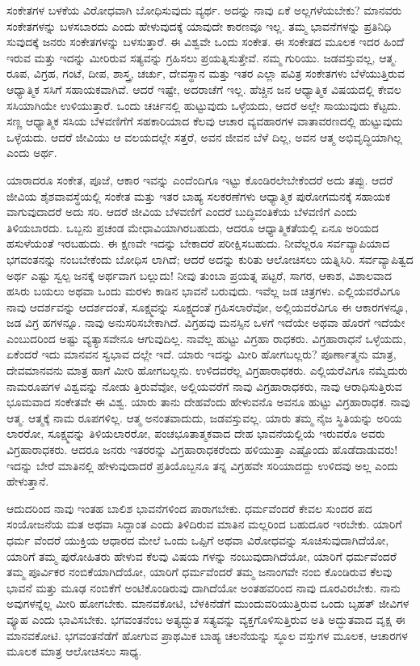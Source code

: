ಸಂಕೇತಗಳ ಬಳಕೆಯ ವಿರೋಧವಾಗಿ ಬೋಧಿಸುವುದು ವ್ಯರ್ಥ. ಅದನ್ನು ನಾವು ಏಕೆ ಅಲ್ಲಗಳೆಯಬೇಕು? ಮಾನವರು ಸಂಕೇತಗಳನ್ನು ಬಳಸಬಾರದು ಎಂದು ಹೇಳುವುದಕ್ಕೆ ಯಾವುದೇ ಕಾರಣವೂ ಇಲ್ಲ. ತಮ್ಮ ಭಾವನೆಗಳನ್ನು ಪ್ರತಿನಿಧಿ ಸುವುದಕ್ಕೆ ಜನರು ಸಂಕೇತಗಳನ್ನು ಬಳಸುತ್ತಾರೆ. ಈ ವಿಶ್ವವೇ ಒಂದು ಸಂಕೇತ. ಈ ಸಂಕೇತದ ಮೂಲಕ ಇದರ ಹಿಂದೆ ಇರುವ ಮತ್ತು ಇದನ್ನು ಮೀರಿರುವ ಸತ್ಯವನ್ನು ಗ್ರಹಿಸಲು ಪ್ರಯತ್ನಿಸುತ್ತೇವೆ. ನಮ್ಮ ಗುರಿಯು. ಜಡವಸ್ತುವಲ್ಲ, ಆತ್ಮ. ರೂಪ, ವಿಗ್ರಹ, ಗಂಟೆ, ದೀಪ, ಶಾಸ್ತ್ರ, ಚರ್ಚು, ದೇವಸ್ಥಾನ ಮತ್ತು ಇತರ ಎಲ್ಲಾ ಪವಿತ್ರ ಸಂಕೇತಗಳು ಬೆಳೆಯುತ್ತಿರುವ ಆಧ್ಯಾತ್ಮಿಕ ಸಸಿಗೆ ಸಹಾಯಕವಾಗಿವೆ. ಆದರೆ ಇಷ್ಟೇ, ಅದರಾಚೆಗೆ ಇಲ್ಲ. ಹೆಚ್ಚಿನ ಜನ ಆಧ್ಯಾತ್ಮಿಕ ವಿಷಯದಲ್ಲಿ ಕೇವಲ ಸಸಿಯಾಗಿಯೇ ಉಳಿಯುತ್ತಾರೆ. ಒಂದು ಚರ್ಚಿನಲ್ಲಿ ಹುಟ್ಟುವುದು ಒಳ್ಳೆಯದು, ಆದರೆ ಅಲ್ಲೇ ಸಾಯುವುದು ಕೆಟ್ಟದು. ಸಣ್ಣ ಆಧ್ಯಾತ್ಮಿಕ ಸಸಿಯ ಬೆಳವಣಿಗೆಗೆ ಸಹಕಾರಿಯಾದ ಕೆಲವು ಆಚಾರ ವ್ಯವಹಾರಗಳ ವಾತಾವರಣದಲ್ಲಿ ಹುಟ್ಟುವುದು ಒಳ್ಳೆಯದು. ಆದರೆ ಜೀವಿಯು ಆ ವಲಯದಲ್ಲೇ ಸತ್ತರೆ, ಅವನ ಜೀವನ ಬೆಳೆ ದಿಲ್ಲ, ಅವನ ಆತ್ಮ ಅಭಿವೃದ್ಧಿಯಾಗಿಲ್ಲ ಎಂದು ಅರ್ಥ.

ಯಾರಾದರೂ ಸಂಕೇತ, ಪೂಜೆ, ಆಕಾರ ಇವನ್ನು ಎಂದೆಂದಿಗೂ ಇಟ್ಟು ಕೊಂಡಿರಲೇಬೇಕೆಂದರೆ ಅದು ತಪ್ಪು. ಆದರೆ ಜೀವಿಯ ಶೈಶವಾವಸ್ಥೆಯಲ್ಲಿ ಸಂಕೇತ ಮತ್ತು ಇತರ ಬಾಹ್ಯ ಸಲಕರಣೆಗಳು ಆಧ್ಯಾತ್ಮಿಕ ಪುರೋಗಮನಕ್ಕೆ ಸಹಾಯಕ ವಾಗುವುದಾದರೆ ಅದು ಸರಿ. ಆದರೆ ಜೀವಿಯ ಬೆಳವಣಿಗೆ ಎಂದರೆ ಬುದ್ಧಿವಂತಿಕೆಯ ಬೆಳವಣಿಗೆ ಎಂದು ತಿಳಿಯಬಾರದು. ಒಬ್ಬನು ಪ್ರಚಂಡ ಮೇಧಾವಿಯಾಗಿರಬಹುದು, ಆದರೂ ಆಧ್ಯಾತ್ಮಿಕತೆಯಲ್ಲಿ ಏನೂ ಅರಿಯದ ಹಸುಳೆಯಂತೆ ಇರಬಹುದು. ಈ ಕ್ಷಣವೇ ಇದನ್ನು ಬೇಕಾದರೆ ಪರೀಕ್ಷಿಸಬಹುದು. ನೀವೆಲ್ಲರೂ ಸರ್ವವ್ಯಾಪಿಯಾದ ಭಗವಂತನನ್ನು ನಂಬಬೇಕೆಂದು ಬೋಧಿಸ ಲಾಗಿದೆ; ಆದರೆ ಅದನ್ನು ಕುರಿತು ಆಲೋಚಿಸಲು ಯತ್ನಿಸಿರಿ. ಸರ್ವವ್ಯಾಪಿತ್ವದ ಅರ್ಥ ಎಷ್ಟು ಸ್ವಲ್ಪ ಜನಕ್ಕೆ ಅರ್ಥವಾಗ ಬಲ್ಲುದು! ನೀವು ತುಂಬಾ ಪ್ರಯತ್ನ ಪಟ್ಟರೆ, ಸಾಗರ, ಆಕಾಶ, ವಿಶಾಲವಾದ ಹಸಿರು ಬಯಲು ಅಥವಾ ಒಂದು ಮರಳು ಕಾಡಿನ ಭಾವನೆ ಬರುವುದು. ಇವೆಲ್ಲ ಜಡ ಚಿತ್ರಗಳು. ಎಲ್ಲಿಯವರೆವಿಗೂ ನಾವು ಆದರ್ಶವನ್ನು ಆದರ್ಶದಂತೆ, ಸೂಕ್ಷ್ಮವನ್ನು ಸೂಕ್ಷ್ಮದಂತೆ ಗ್ರಹಿಸಲಾರೆವೋ, ಅಲ್ಲಿಯವರೆವಿಗೂ ಈ ಆಕಾರಗಳನ್ನೂ, ಜಡ ವಿಗ್ರ ಹಗಳನ್ನೂ. ನಾವು ಅನುಸರಿಸಬೇಕಾಗಿದೆ. ವಿಗ್ರಹವು ಮನಸ್ಸಿನ ಒಳಗೆ ಇದೆಯೇ ಅಥವಾ ಹೊರಗೆ ಇದೆಯೇ ಎಂಬುದರಿಂದ ಅಷ್ಟು ವ್ಯತ್ಯಾಸವೇನೂ ಆಗುವುದಿಲ್ಲ. ನಾವೆಲ್ಲ ಹುಟ್ಟು ವಿಗ್ರಹಾ ರಾಧಕರು. ವಿಗ್ರಹಾರಾಧನೆ ಒಳ್ಳೆಯದು, ಏಕೆಂದರೆ ಇದು ಮಾನವನ ಸ್ವಭಾವ ದಲ್ಲೇ ಇದೆ. ಯಾರು ಇದನ್ನು ಮೀರಿ ಹೋಗಬಲ್ಲರು? ಪೂರ್ಣಾತ್ಮನು ಮಾತ್ರ, ದೇವಮಾನವನು ಮಾತ್ರ ಹಾಗೆ ಮೀರಿ ಹೋಗಬಲ್ಲನು. ಉಳಿದವರೆಲ್ಲ ವಿಗ್ರಹಾರಾಧಕರು. ಎಲ್ಲಿಯರೆವಿಗೂ ನಮ್ಮೆದುರು ನಾಮರೂಪಗಳ ವಿಶ್ವವನ್ನು ನೋಡು ತ್ತಿರುವೆವೋ, ಅಲ್ಲಿಯವರೆಗೆ ನಾವು ವಿಗ್ರಹಾರಾಧಕರು, ನಾವು ಆರಾಧಿಸುತ್ತಿರುವ ಭೂಮವಾದ ಸಂಕೇತವೇ ಈ ವಿಶ್ವ. ಯಾರು ತಾನು ದೇಹವೆಂದು ಹೇಳುವನೊ ಅವನೂ ಹುಟ್ಟು ವಿಗ್ರಹಾರಾಧಕ. ನಾವು ಆತ್ಮ. ಆತ್ಮಕ್ಕೆ ನಾಮ ರೂಪಗಳಿಲ್ಲ. ಆತ್ಮ ಅನಂತವಾದುದು, ಜಡವಸ್ತುವಲ್ಲ. ಯಾರು ತಮ್ಮ ನೈಜ ಸ್ಥಿತಿಯನ್ನು ಅರಿಯ ಲಾರರೋ, ಸೂಕ್ಷ್ಮವನ್ನು ತಿಳಿಯಲಾರರೋ, ಪಂಚಭೂತಾತ್ಮಕವಾದ ದೇಹ ಭಾವನೆಯಲ್ಲಿಯೆ ಇರುವರೊ ಅವರು ವಿಗ್ರಹಾರಾಧಕರು. ಆದರೂ ಜನರು ಇತರರನ್ನು ವಿಗ್ರಹಾರಾಧಕರೆಂದು ಹಳಿಯುತ್ತಾ ಎಷ್ಟೊಂದು ಹೊಡೆದಾಡುವರು! ಇದನ್ನು ಬೇರೆ ಮಾತಿನಲ್ಲಿ ಹೇಳುವುದಾದರೆ ಪ್ರತಿಯೊಬ್ಬನೂ ತನ್ನ ವಿಗ್ರಹವೇ ಸರಿಯಾದದ್ದು ಉಳಿದವು ಅಲ್ಲ ಎಂದು ಹೇಳುತ್ತಾನೆ.

ಆದುದರಿಂದ ನಾವು ಇಂತಹ ಬಾಲಿಶ ಭಾವನೆಗಳಿಂದ ಪಾರಾಗಬೇಕು. ಧರ್ಮವೆಂದರೆ ಕೇವಲ ಸುಂದರ ಪದ ಸಂಯೋಜನೆಯ ಮತ ಅಥವಾ ಸಿದ್ದಾಂತ ಎಂದು ತಿಳಿದಿರುವ ಮಾತಿನ ಮಲ್ಲರಿಂದ ಬಹುದೂರ ಇರಬೇಕು. ಯಾರಿಗೆ ಧರ್ಮ ವೆಂದರೆ ಯುಕ್ತಿಯ ಆಧಾರದ ಮೇಲೆ ಒಂದು ಒಪ್ಪಿಗೆ ಅಥವಾ ವಿರೋಧವನ್ನು ಸೂಚಿಸುವುದಾಗಿದೆಯೋ, ಯಾರಿಗೆ ತಮ್ಮ ಪುರೋಹಿತರು ಹೇಳುವ ಕೆಲವು ವಿಷಯ ಗಳನ್ನು ನಂಬುವುದಾಗಿದೆಯೋ, ಯಾರಿಗೆ ಧರ್ಮವೆಂದರೆ ತಮ್ಮ ಪೂರ್ವಿಕರ ನಂಬಿಕೆಯಾಗಿದೆಯೋ, ಯಾರಿಗೆ ಧರ್ಮವೆಂದರೆ ತಮ್ಮ ಜನಾಂಗವೇ ನಂಬಿ ಕೊಂಡಿರುವ ಕೆಲವು ಭಾವನೆ ಮತ್ತು ಮೂಢ ನಂಬಿಕೆಗೆ ಅಂಟಿಕೊಂಡಿರುವು ದಾಗಿದೆಯೋ ಅಂತಹವರಿಂದ ನಾವು ದೂರವಿರಬೇಕು. ನಾನು ಅವುಗಳನ್ನೆಲ್ಲ ಮೀರಿ ಹೋಗಬೇಕು. ಮಾನವಕೋಟಿ, ಬೆಳಕಿನೆಡೆಗೆ ಮುಂದುವರಿಯು\-ತ್ತಿರುವ ಒಂದು ಬೃಹತ್​ ಜೀವಿಗಳ ವ್ಯೂಹ ಎಂದು ಭಾವಿಸಬೇಕು. ಭಗವಂತನೆಂಬ ಅತ್ಯದ್ಭುತ ಸತ್ಯವನ್ನು ವ್ಯಕ್ತಗೊಳಿಸುತ್ತಿರುವ ಅತಿ ಅದ್ಭುತವಾದ ವೃಕ್ಷ ಈ ಮಾನವಕೋಟಿ. ಭಗವಂತನೆಡೆಗೆ ಹೋಗುವ ಪ್ರಾಥಮಿಕ ಬಾಹ್ಯ ಚಲನೆಯನ್ನು ಸ್ಥೂಲ ವಸ್ತುಗಳ ಮೂಲಕ, ಆಚಾರಗಳ ಮೂಲಕ ಮಾತ್ರ ಆಲೋಚಿಸಲು ಸಾಧ್ಯ.

